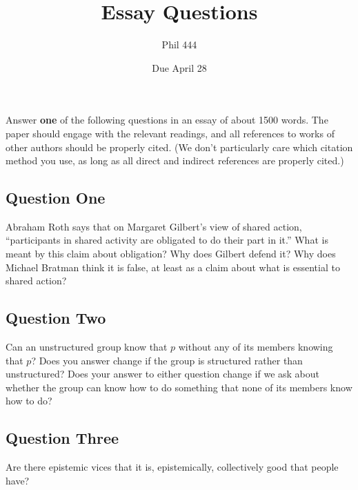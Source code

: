 \documentclass[
]{article}
\title{Essay Questions}
\author{Phil 444}
\date{Due April 28}
\begin{document}
\maketitle

Answer \textbf{one} of the following questions in an essay of about 1500
words. The paper should engage with the relevant readings, and all
references to works of other authors should be properly cited. (We don't
particularly care which citation method you use, as long as all direct
and indirect references are properly cited.)

\hypertarget{question-one}{%
\subsection*{Question One}\label{question-one}}

Abraham Roth says that on Margaret Gilbert's view of shared action,
``participants in shared activity are obligated to do their part in
it.'' What is meant by this claim about obligation? Why does Gilbert
defend it? Why does Michael Bratman think it is false, at least as a
claim about what is essential to shared action?

\hypertarget{question-two}{%
\subsection*{Question Two}\label{question-two}}

Can an unstructured group know that \(p\) without any of its members
knowing that \(p\)? Does you answer change if the group is structured
rather than unstructured? Does your answer to either question change if
we ask about whether the group can know how to do something that none of
its members know how to do?

\hypertarget{question-three}{%
\subsection*{Question Three}\label{question-three}}

Are there epistemic vices that it is, epistemically, collectively good
that people have?
\end{document}
